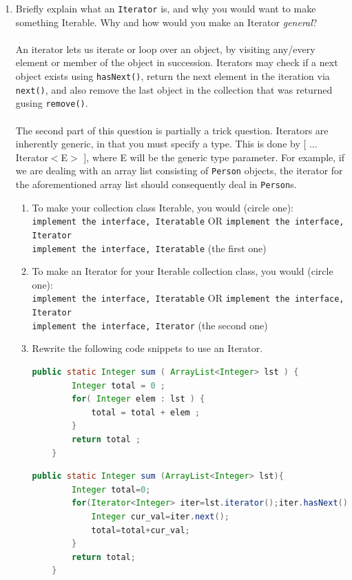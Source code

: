 \documentclass[11pt]{article}
\newenvironment{answer}{\large\lstset{basicstyle=\tiny\ttfamily}\color{white} }{}
\newenvironment{answer}{\large\lstset{basicstyle=\large\ttfamily}\color{red} }{}
\begin{document}
\begin{enumerate}
\item Briefly explain what an \texttt{Iterator} is, and why you would want
to make something Iterable. Why and how would you make an Iterator \emph{general}? \\ \\
\begin{answer}
An iterator lets us iterate or loop over an object, by visiting any/every element or member of the object in succession. Iterators may check if a next object exists using \texttt{hasNext()}, return the next element in the iteration via \texttt{next()}, and also remove the last object in the collection that was returned gusing \texttt{remove()}. \\ \\ The second part of this question is partially a trick question. Iterators are inherently generic, in that you must specify a type. This is done by [ ... Iterator$<$E$>$ ], where E will be the generic type parameter. For example, if we are dealing with an array list consisting of \texttt{Person} objects, the iterator for the aforementioned array list should consequently deal in \texttt{Person}s.
\end{answer}
\begin{enumerate}
	\item To make your collection class Iterable, you would (circle one):\\
	\texttt{implement the interface, Iteratable} OR \texttt{implement the interface, Iterator}\\
	\begin{answer}
		\texttt{implement the interface, Iteratable} (the first one)
	\end{answer}
	\item To make an Iterator for your Iterable collection class, you would (circle one):\\
	\texttt{implement the interface, Iteratable} OR \texttt{implement the interface, Iterator}\\
	\begin{answer}
	\texttt{implement the interface, Iterator} (the second one)
	\end{answer}
	\item Rewrite the following code snippets to use an Iterator.
	\begin{lstlisting}[language=java]
	public static Integer sum ( ArrayList<Integer> lst ) {
		Integer total = 0 ;
		for( Integer elem : lst ) {
			total = total + elem ;
		}
		return total ;
	}
	\end{lstlisting}
	\begin{answer}
	\begin{lstlisting}[language=java]
	public static Integer sum (ArrayList<Integer> lst){
		Integer total=0;
		for(Iterator<Integer> iter=lst.iterator();iter.hasNext();){
			Integer cur_val=iter.next(); 
			total=total+cur_val;
		}
		return total;
	}
	\end{lstlisting}
	\end{answer}


\end{enumerate}
\end{enumerate}
\end{document}
